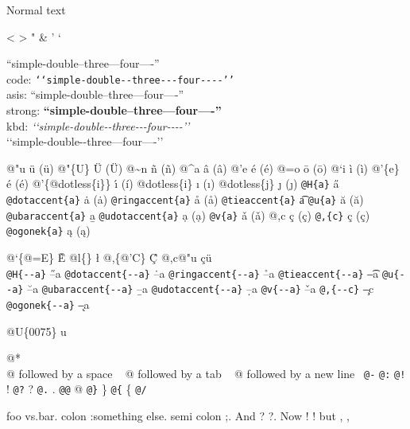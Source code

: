 \documentclass{book}
\newcommand\Texinfocommandstyletextkbd[1]{{\ttfamily\textsl{#1}}}%
\renewcommand{\_}{\Texinfounderscore\discretionary{}{}{}}
\begin{document}
Normal text

<
>
"
\&
'
`

``simple-double--three---four----''\leavevmode{}\\
code: \texttt{{`}{`}simple-double{-}{-}three{-}{-}{-}four{-}{-}{-}-{'}{'}} \leavevmode{}\\
asis: ``simple-double--three---four----'' \leavevmode{}\\
strong: \textbf{``simple-double--three---four----''} \leavevmode{}\\
kbd: \Texinfocommandstyletextkbd{{`}{`}simple-double{-}{-}three{-}{-}{-}four{-}{-}{-}-{'}{'}} \leavevmode{}\\

`\hbox{}`simple-double-\hbox{}-three---four----'\hbox{}'\leavevmode{}\\

%
%
%
%

@"u \"{u} (ü)
@"\{U\} \"{U} (Ü) 
@\~{}n \~{n} (ñ)
@\^{}a \^{a} (â)
@'e \'{e} (é)
@=o \={o} (ō)
@`i \`{i} (ì)
@'\{e\} \'{e} (é)
@'\{@dotless\{i\}\} \'{\i{}} (í)
@dotless\{i\} \i{} (ı)
@dotless\{j\} \j{} (ȷ)
\texttt{@H\{a\}} \H{a}
\texttt{@dotaccent\{a\}} \.{a} (ȧ)
\texttt{@ringaccent\{a\}} \r{a} (å)
\texttt{@tieaccent\{a\}} \t{a}
\texttt{@u\{a\}} \u{a} (ă)
\texttt{@ubaraccent\{a\}} \b{a}
\texttt{@udotaccent\{a\}} \d{a} (ạ)
\texttt{@v\{a\}} \v{a} (ǎ)
@,c \c{c} (ç)
\texttt{@,\{c\}} \c{c} (ç)
\texttt{@ogonek\{a\}} \k{a} (ą)

@`\{@=E\} \`{\={E}}
@l\{\} \l{}
@,\{@'C\} \c{\'{C}}
@,c@"u \c{c}\"{u} \leavevmode{}\\

\texttt{@H\{{-}{-}a\}} \H{--a}
\texttt{@dotaccent\{{-}{-}a\}} \.{--a}
\texttt{@ringaccent\{{-}{-}a\}} \r{--a}
\texttt{@tieaccent\{{-}{-}a\}} \t{--a}
\texttt{@u\{{-}{-}a\}} \u{--a}
\texttt{@ubaraccent\{{-}{-}a\}} \b{--a}
\texttt{@udotaccent\{{-}{-}a\}} \d{--a}
\texttt{@v\{{-}{-}a\}} \v{--a}
\texttt{@,\{{-}{-}c\}} \c{--c}
\texttt{@ogonek\{{-}{-}a\}} \k{--a}

@U\{0075\} u

@* \leavevmode{}\\
@ followed by a space
\ {}
@ followed by a tab
\ {}
@ followed by a new line
\ {}\texttt{@-} \-{}
\texttt{@:} \@
\texttt{@!} \@!
\texttt{@?} \@?
\texttt{@.} \@.
\texttt{@@} @
\texttt{@\}} \}
\texttt{@\{} \{
\texttt{@/} 

foo vs.\@ bar. 
colon :\@And something else.
semi colon ;\@.
And ? ?\@.
Now ! !\@@
but , ,\@
\end{document}
